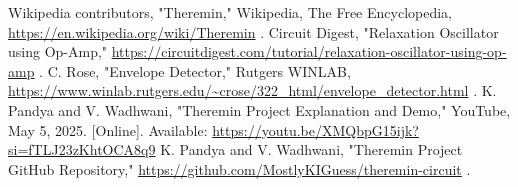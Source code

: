 \documentclass[conference]{IEEEtran}
\begin{document}
\begin{thebibliography}{9}
 Wikipedia contributors, "Theremin," Wikipedia, The Free Encyclopedia, \url{https://en.wikipedia.org/wiki/Theremin} .
 Circuit Digest, "Relaxation Oscillator using Op-Amp," \url{https://circuitdigest.com/tutorial/relaxation-oscillator-using-op-amp} .
 C. Rose, "Envelope Detector," Rutgers WINLAB, \url{https://www.winlab.rutgers.edu/~crose/322_html/envelope_detector.html} .
 K. Pandya and V. Wadhwani, "Theremin Project Explanation and Demo," YouTube, May 5, 2025. [Online]. Available: \url{https://youtu.be/XMQbpG15ijk?si=fTLJ23zKhtOCA8q9}
 K. Pandya and V. Wadhwani, "Theremin Project GitHub Repository," \url{https://github.com/MostlyKIGuess/theremin-circuit} .

\end{thebibliography}
\end{document}
